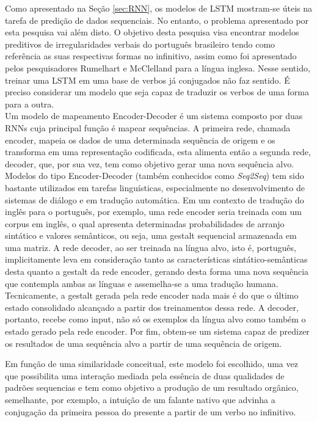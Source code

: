 Como apresentado na Seção \ref{sec:RNN}, os modelos de LSTM mostram-se úteis na tarefa de predição de dados sequenciais. No entanto, o problema apresentado por esta pesquisa vai além disto. O objetivo desta pesquisa visa encontrar modelos preditivos de irregularidades verbais do português brasileiro tendo como referência as suas respectivas formas no infinitivo, assim como foi apresentado pelos pesquisadores Rumelhart e McClelland para a língua inglesa. Nesse sentido, treinar uma LSTM em uma base de verbos já conjugados não faz sentido. É preciso considerar um modelo que seja capaz de traduzir os verbos de uma forma para a outra. \\

Um modelo de mapeamento Encoder-Decoder é um sistema composto por duas RNNs cuja principal função é mapear sequências. A primeira rede, chamada encoder, mapeia os dados de uma determinada sequência de origem e os transforma em uma representação codificada, esta alimenta então a segunda rede, decoder, que, por sua vez, tem como objetivo gerar uma nova sequência alvo.  %
Modelos do tipo Encoder-Decoder (também conhecidos como \textit{Seq2Seq}) tem sido bastante utilizados em tarefas linguísticas, especialmente no desenvolvimento de sistemas de diálogo e em tradução automática. Em um contexto de tradução do inglês para o português, por exemplo, uma rede encoder seria treinada com um corpus em inglês, o qual apresenta determinadas probabilidades de arranjo sintático e valores semânticos, ou seja, uma gestalt sequencial armazenada em uma matriz. A rede decoder, ao ser treinada na língua alvo, isto é, português, implicitamente leva em consideração tanto as características sintático-semânticas desta quanto a gestalt da rede encoder, gerando desta forma uma nova sequência que contempla ambas as línguas e assemelha-se a uma tradução humana. Tecnicamente, a gestalt gerada pela rede encoder nada mais é do que o último estado consolidado alcançado a partir dos treinamentos dessa rede. A decoder, portanto, recebe como input, não só os exemplos da língua alvo como também o estado gerado pela rede encoder. Por fim, obtem-se um sistema capaz de predizer os resultados de uma sequência alvo a partir de uma sequência de origem.

Em função de uma similaridade conceitual, este modelo foi escolhido, uma vez que possibilita uma interação mediada pela essência de duas qualidades de padrões sequencias e tem como objetivo a produção de um resultado orgânico, semelhante, por exemplo, a intuição de um falante nativo que advinha a conjugação da primeira pessoa do presente a partir de um verbo no infinitivo. 



